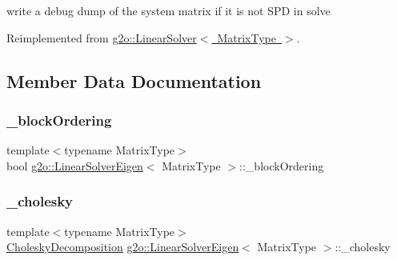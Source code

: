 write a debug dump of the system matrix if it is not S\+PD in solve 



Reimplemented from \mbox{\hyperlink{classg2o_1_1_linear_solver_ac4b23c56cf69759a692906fc8816cf8f}{g2o\+::\+Linear\+Solver$<$ Matrix\+Type $>$}}.



\subsection{Member Data Documentation}
\mbox{\label{classg2o_1_1_linear_solver_eigen_a041970f37a5a6e63778f0c40e7c6e948}} 
\subsubsection{\texorpdfstring{\+\_\+block\+Ordering}{\_blockOrdering}}
{\footnotesize\ttfamily template$<$typename Matrix\+Type$>$ \\
bool \mbox{\hyperlink{classg2o_1_1_linear_solver_eigen}{g2o\+::\+Linear\+Solver\+Eigen}}$<$ Matrix\+Type $>$\+::\+\_\+block\+Ordering\hspace{0.3cm}{\ttfamily [protected]}}

\mbox{\label{classg2o_1_1_linear_solver_eigen_ab7205de4c6820b3ecd7ed7f39bbdf573}} 
\subsubsection{\texorpdfstring{\+\_\+cholesky}{\_cholesky}}
{\footnotesize\ttfamily template$<$typename Matrix\+Type$>$ \\
\mbox{\hyperlink{classg2o_1_1_linear_solver_eigen_1_1_cholesky_decomposition}{Cholesky\+Decomposition}} \mbox{\hyperlink{classg2o_1_1_linear_solver_eigen}{g2o\+::\+Linear\+Solver\+Eigen}}$<$ Matrix\+Type $>$\+::\+\_\+cholesky\hspace{0.3cm}{\ttfamily [protected]}}

